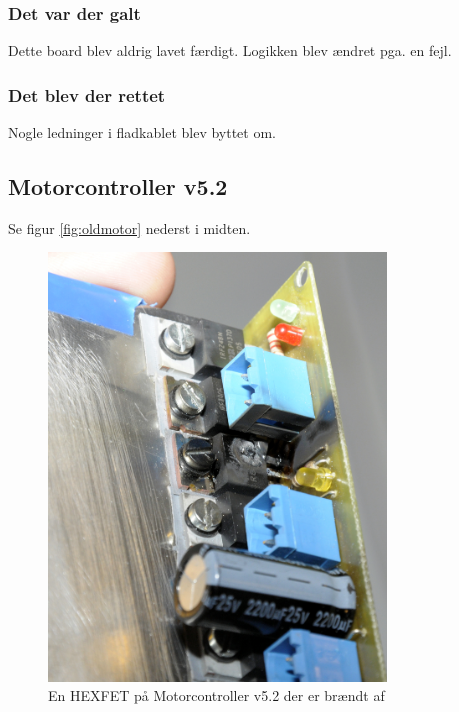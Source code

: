 \documentclass[a4paper,11pt,oneside,article,danish,table]{memoir}
\newcommand{\boarddate}[1]{\marginpar{\tiny\textcolor{blue!80!black}{#1}}}
\begin{document}
\subsubsection{Det var der galt} 
Dette board blev aldrig lavet færdigt.
Logikken blev ændret pga. en fejl.
\subsubsection{Det blev der rettet}
Nogle ledninger i fladkablet blev byttet om.
\subsection{Motorcontroller v5.2}
\boarddate{24. april 2012}
Se figur \ref{fig:oldmotor} nederst i midten.
\begin{figure}[htbp]
  \centering
  \includegraphics[width=0.8\textwidth]{pictures/fried.jpg}
  \caption[]{En HEXFET på Motorcontroller v5.2 der er brændt af}
  \label{fig:fried}
\end{figure}
\end{document}
